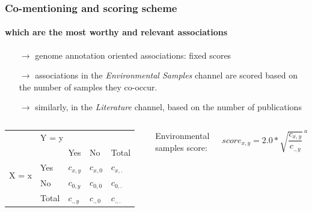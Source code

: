 \documentclass{beamer}
\begin{document}
   \begin{frame}
      \frametitle{Co-mentioning and scoring scheme }
      \framesubtitle{which are the most worthy and relevant associations}

      \small
      \begin{itemize}
         \item [$\rightarrow$] genome annotation oriented associations: fixed scores
         \item [$\rightarrow$] associations in the \textit{Environmental Samples} channel are scored based on the number of samples they co-occur. 
         \item [$\rightarrow$] similarly, in the \textit{Literature} channel, based on the number of publications
      \end{itemize}
 
      \begin{columns}[onlytextwidth]
            \begin{table}[ht]
               \begin{tabular}{c|llll}
                & \multicolumn{4}{l}{Y = y} \\ \cline{2-5} 
               \multirow{4}{*}{X = x} &  & Yes & No & Total \\ \cline{3-5} 
                & \multicolumn{1}{l|}{Yes} & $c_{x,y}$ & $c_{x,0}$ & $c_{x,.}$ \\
                & \multicolumn{1}{l|}{No} & $c_{0,y}$ & $c_{0,0}$ & $c_{0,.}$ \\
                & \multicolumn{1}{l|}{Total} & $c_{.,y}$ & $c_{.,0}$ & $c_{.,.}$
               \end{tabular}
            \end{table}

               Environmental samples score: 

                  \begin{equation}
                     score_{x,y} = 2.0*\sqrt{\frac{c_{x,y}}{c_{.,y}}}^{ \:a}
                  \end{equation}


\end{columns}
\end{frame}
\end{document}
